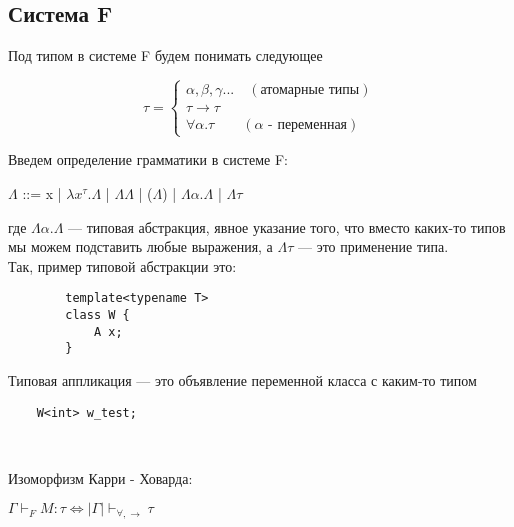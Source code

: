  	\subsection{Система F}
 	
\begin{definition}
	 	Под типом в системе F будем понимать следующее

 	
 	\begin{equation*}
 	\tau =
 	\begin{cases}
 	\alpha,\beta,\gamma ...\quad(\text{атомарные типы}) \\
 	\tau\rightarrow\tau \\
 	\forall\alpha.\tau\qquad(\alpha\text{ - переменная})
 	\end{cases}
 	\end{equation*}
 \end{definition}

 \begin{definition}
 		\large Введем определение грамматики в системе F:
 	\begin{center}
 		\large $\Lambda$ ::= x | $\lambda x^{\tau}.\Lambda$ | $\Lambda\Lambda$ | ($\Lambda$) | $\Lambda\alpha.\Lambda$ | $\Lambda\tau$ 
 	\end{center}
 \end{definition}
 	
	где $\Lambda\alpha.\Lambda$ — типовая абстракция, явное указание того, что вместо каких-то типов мы можем подставить любые выражения, а $\Lambda\tau$ — это применение типа. \\
 	
 	
 	Так, пример типовой абстракции это: 
 	\begin{verbatim}
 		template<typename T>
 		class W {
 		    A x;
 		}
 	\end{verbatim}
 	
	Типовая аппликация — это объявление переменной класса с каким-то типом
 	
 	\begin{verbatim}
 	W<int> w_test;
 	\end{verbatim}\
 	
 	\begin{theorem}
 		Изоморфизм Карри - Ховарда:
    \begin{center}
 		$\Gamma\vdash_F M:\tau\Leftrightarrow |\Gamma|\vdash_{\forall, \rightarrow}\tau$ 
    \end{center}
 	
 	\end{theorem}
 	
